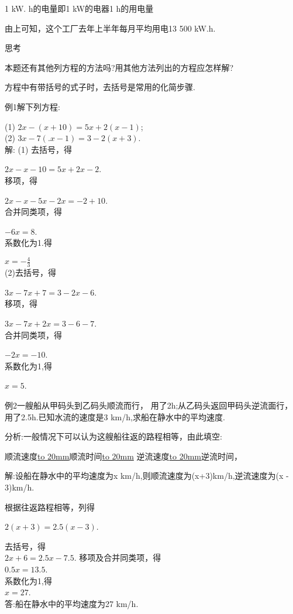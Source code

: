 \documentclass{article}
\begin{document}
\begin{article}
\begin{example}
1 kW. h的电量即1 kW的电器1 h的用电量

由上可知，这个工厂去年上半年每月平均用电13 500 kW.h.

思考

本题还有其他列方程的方法吗?用其他方法列出的方程应怎样解?

      方程中有带括号的式子时，去括号是常用的化简步骤.

      例1解下列方程:

      (1) $2x-(x+10)=5x+2(x- 1)$;\\(2) $3x- 7(.x- 1)=3- 2(x+3)$.\\解: (1) 去括号，得

      $2x-x-10=5x+2x-2$.\\移项，得

      $2x-x-5x-2x=-2+10$.\\合并同类项，得

      $-6x=8$.\\系数化为1.得

      $x=-\frac{4}{3}$\\(2)去括号，得

      $3x-7x+7=3-2x-6$.\\移项，得

      $3x-7x+2x=3-6-7$.\\合并同类项，得

      $-2x=-10$.\\系数化为1,得

      $x=5$.

      例2一艘船从甲码头到乙码头顺流而行， 用了2h;从乙码头返回甲码头逆流面行，用了2.5h.已知水流的速度是3 km/h,求船在静水中的平均速度.

      分析:一般情况下可以认为这艘船往返的路程相等，由此填空:

      顺流速度\underline{\hbox to 20mm}顺流时间\underline{\hbox to 20mm} 逆流速度\underline{\hbox to 20mm}逆流时间，

      解:设船在静水中的平均速度为x km/h,则顺流速度为(x+3)km/h,逆流速度为(x - 3)km/h.

      根据往返路程相等，列得

      $2(x+3)=2.5(x- 3)$.
      
去括号，得\\
$2x+6=2.5x-7.5$.
移项及合并同类项，得\\
$0.5x=13.5$.\\
系数化为1,得\\
$x=27$.\\
答:船在静水中的平均速度为27 km/h.\\
\end{example}



\end{article}
\end{document}
